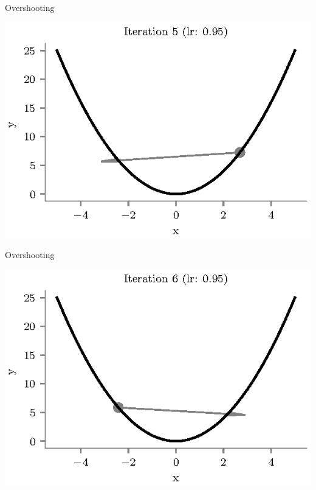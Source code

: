 \documentclass{beamer}
\begin{document}
\begin{frame}{Overshooting}
\begin{center}
\includegraphics[totalheight=6cm]{gradient-descent/overshooting-5.eps}
\end{center}
\end{frame}

\begin{frame}{Overshooting}
\begin{center}
\includegraphics[totalheight=6cm]{gradient-descent/overshooting-6.eps}
\end{center}
\end{frame}
\end{document}

